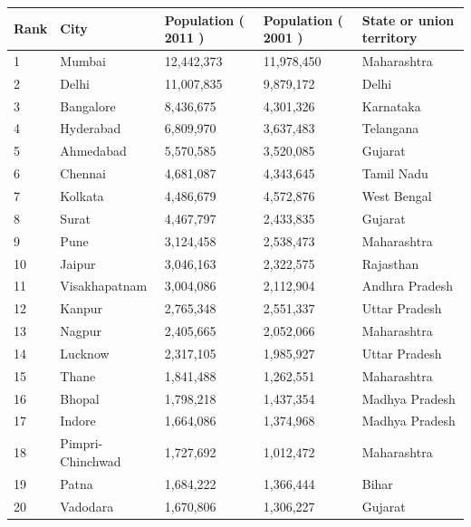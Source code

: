 \documentclass{article}
\begin{document}
\begin{tabular}{lllll}
\toprule
Rank & City & Population ( 2011 ) & Population ( 2001 ) & State or union territory \\
\midrule
1 & Mumbai & 12,442,373 & 11,978,450 & Maharashtra \\
2 & Delhi & 11,007,835 & 9,879,172 & Delhi \\
3 & Bangalore & 8,436,675 & 4,301,326 & Karnataka \\
4 & Hyderabad & 6,809,970 & 3,637,483 & Telangana \\
5 & Ahmedabad & 5,570,585 & 3,520,085 & Gujarat \\
6 & Chennai & 4,681,087 & 4,343,645 & Tamil Nadu \\
7 & Kolkata & 4,486,679 & 4,572,876 & West Bengal \\
8 & Surat & 4,467,797 & 2,433,835 & Gujarat \\
9 & Pune & 3,124,458 & 2,538,473 & Maharashtra \\
10 & Jaipur & 3,046,163 & 2,322,575 & Rajasthan \\
11 & Visakhapatnam & 3,004,086 & 2,112,904 & Andhra Pradesh \\
12 & Kanpur & 2,765,348 & 2,551,337 & Uttar Pradesh \\
13 & Nagpur & 2,405,665 & 2,052,066 & Maharashtra \\
14 & Lucknow & 2,317,105 & 1,985,927 & Uttar Pradesh \\
15 & Thane & 1,841,488 & 1,262,551 & Maharashtra \\
16 & Bhopal & 1,798,218 & 1,437,354 & Madhya Pradesh \\
17 & Indore & 1,664,086 & 1,374,968 & Madhya Pradesh \\
18 & Pimpri-Chinchwad & 1,727,692 & 1,012,472 & Maharashtra \\
19 & Patna & 1,684,222 & 1,366,444 & Bihar \\
20 & Vadodara & 1,670,806 & 1,306,227 & Gujarat \\
\bottomrule
\end{tabular}
\end{document}
